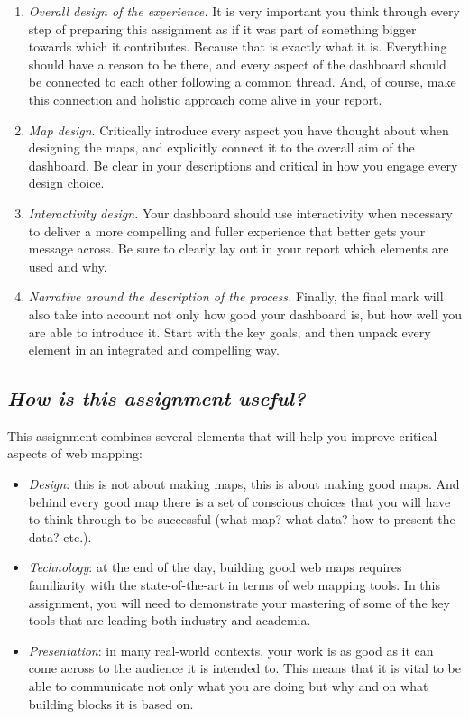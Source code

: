 \documentclass[
  letterpaper,
  DIV=11,
  numbers=noendperiod]{scrreprt}
\providecommand{\tightlist}{%
  \setlength{\itemsep}{0pt}\setlength{\parskip}{0pt}}\usepackage{longtable,booktabs,array}
\begin{document}
\begin{enumerate}
\def\labelenumi{\arabic{enumi}.}
\tightlist
\item
  \emph{Overall design of the experience.} It is very important you
  think through every step of preparing this assignment as if it was
  part of something bigger towards which it contributes. Because that is
  exactly what it is. Everything should have a reason to be there, and
  every aspect of the dashboard should be connected to each other
  following a common thread. And, of course, make this connection and
  holistic approach come alive in your report.
\item
  \emph{Map design}. Critically introduce every aspect you have thought
  about when designing the maps, and explicitly connect it to the
  overall aim of the dashboard. Be clear in your descriptions and
  critical in how you engage every design choice.
\item
  \emph{Interactivity design.} Your dashboard should use interactivity
  when necessary to deliver a more compelling and fuller experience that
  better gets your message across. Be sure to clearly lay out in your
  report which elements are used and why.
\item
  \emph{Narrative around the description of the process.} Finally, the
  final mark will also take into account not only how good your
  dashboard is, but how well you are able to introduce it. Start with
  the key goals, and then unpack every element in an integrated and
  compelling way.
\end{enumerate}

\subsection*{\texorpdfstring{\emph{How is this assignment
useful?}}{How is this assignment useful?}}\label{how-is-this-assignment-useful-1}

This assignment combines several elements that will help you improve
critical aspects of web mapping:

\begin{itemize}
\tightlist
\item
  \emph{Design}: this is not about making maps, this is about making
  good maps. And behind every good map there is a set of conscious
  choices that you will have to think through to be successful (what
  map? what data? how to present the data? etc.).
\item
  \emph{Technology}: at the end of the day, building good web maps
  requires familiarity with the state-of-the-art in terms of web mapping
  tools. In this assignment, you will need to demonstrate your mastering
  of some of the key tools that are leading both industry and academia.
\item
  \emph{Presentation}: in many real-world contexts, your work is as good
  as it can come across to the audience it is intended to. This means
  that it is vital to be able to communicate not only what you are doing
  but why and on what building blocks it is based on.
\end{itemize}
\end{document}
